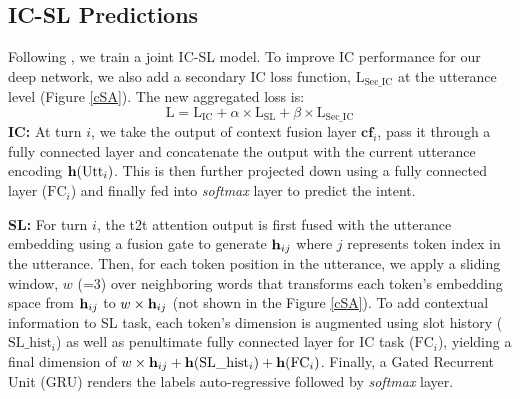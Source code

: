 \subsection{IC-SL Predictions}
Following \cite{joint_ic_sl, li2018self}, we  train a joint IC-SL model. To improve IC performance for our deep network, we also add a secondary IC loss function, $\text{L}_{\text{Sec}\_\text{IC}}$ at the utterance level (Figure \ref{cSA}). The new aggregated loss is:
\begin{equation}
    \text{L}=\text{L}_{\text{IC}} + \alpha \times \text{L}_{\text{SL}} + \beta \times \text{L}_{\text{Sec}\_\text{IC}}
\end{equation}
\textbf{IC:} At turn $i$, we take the output of context fusion layer $\mathbf{cf}_i$, pass it through a fully connected layer and concatenate the output with the current utterance encoding $\mathbf{h}({\text{Utt}_i})$. 
This is then further projected down using a fully connected layer ($\text{FC}_i$) and finally fed into  \emph{softmax} layer to predict the intent.
\newline




\noindent\textbf{SL:} For turn $i$, the t2t attention output is first fused with the utterance embedding using a fusion gate \cite{hochreiter1997long} to generate $\mathbf{h}_{ij}$ where $j$ represents token index in the utterance. 
Then, for each token position in the utterance,
we apply a sliding window, $w$ (=3) over neighboring words
that transforms each token's embedding space from $\mathbf{h}_{ij}$ to $w \times \mathbf{h}_{ij}$ (not shown in the Figure \ref{cSA}). 
To add contextual information to SL task, each token's dimension is augmented using slot history ($\text{SL}\_\text{hist}_{i}$)  as well as penultimate fully connected layer for IC task ($\text{FC}_i$), yielding a final dimension of $w \times \mathbf{h}_{ij} +  \mathbf{h}({\text{SL}\_{\text{hist}}_i}) +   \mathbf{h}({\text{FC}_i})$. Finally, a Gated Recurrent Unit (GRU) renders the labels auto-regressive followed by \emph{softmax} layer.

